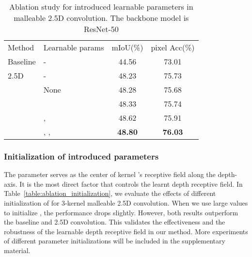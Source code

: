 \documentclass[runningheads]{llncs}
\begin{document}
\begin{table}[htbp]
  \begin{center}
  \caption{
  Ablation study for introduced learnable parameters in malleable 2.5D convolution.
  The backbone model is ResNet-50
  }
  \label{table:ablation_learnable_params}
  \setlength{\tabcolsep}{10pt}
  \begin{tabular}{llcc}
    \hline\noalign{\smallskip}
    Method & Learnable params & mIoU(\%) & pixel Acc(\%)\\
    \noalign{\smallskip}
    \hline
    \noalign{\smallskip}
    Baseline      & - & 44.56  & 73.01 \\
    2.5D\cite{2_5D}          & - & 48.23 & 75.73 \\
    \noalign{\smallskip}
    \hline
    \noalign{\smallskip}
    \multirow{4}{*}{Malleable 2.5D} & None              & 48.28 & 75.68 \\
     &              & 48.33 & 75.74 \\
     & ,         & 48.62 & 75.91 \\
     & , ,  & \textbf{48.80} & \textbf{76.03} \\
    \hline
  \end{tabular}
  \end{center}
\end{table}

\subsubsection{Initialization of introduced parameters}
The parameter  serves as the center of kernel 's receptive field along the depth-axis.
It is the most direct factor that controls the learnt depth receptive field.
In Table~\ref{table:ablation_initialization}, we evaluate the effects of different initialization of  for 3-kernel malleable 2.5D convolution.
When we use large values to initialize , the performance drops slightly.
However, both results outperform the baseline and 2.5D convolution.
This validates the effectiveness and the robustness of the learnable depth receptive field in our method.
More experiments of different parameter initializations will be included in the supplementary material.
\end{document}
